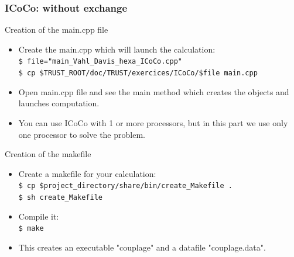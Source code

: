 \documentclass[10pt, hyperref={unicode=true,pdfusetitle, bookmarks=true,bookmarksnumbered=false,bookmarksopen=false, breaklinks=false,pdfborder={0 0 1},backref=true,colorlinks=true,linkcolor=darkblue,pageanchor, urlcolor=darkblue}]{beamer}
\begin{document}
\begin{frame}
\frametitle{ICoCo: without exchange}

\begin{block}{Creation of the main.cpp file}
\begin{itemize}
\item Create the main.cpp which will launch the calculation:\\
\texttt{\$ file="main\_Vahl\_Davis\_hexa\_ICoCo.cpp"} \\
\texttt{\$ cp \$TRUST\_ROOT/doc/TRUST/exercices/ICoCo/\$file main.cpp}\\
\item Open main.cpp file and see the main method which creates the objects and launches computation.
\item You can use ICoCo with 1 or more processors, but in this part we use only one processor to solve the problem.
\end{itemize}
\end{block}

\begin{block}{Creation of the makefile}
\begin{itemize}
\item Create a makefile for your calculation:\\
\texttt{\$ cp \$project\_directory/share/bin/create\_Makefile .} \\
\texttt{\$ sh create\_Makefile}
\item Compile it:\\
\texttt{\$ make}
\item This creates an executable "couplage" and a datafile "couplage.data".
\end{itemize}

\end{block}
\end{frame}
\end{document}
